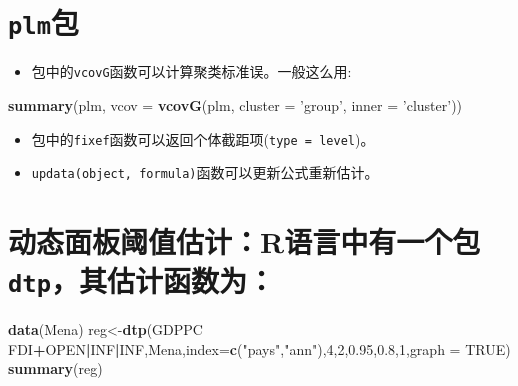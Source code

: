 \documentclass[
]{book}
\newenvironment{Shaded}{\begin{snugshade}}{\end{snugshade}}
\newcommand{\DataTypeTok}[1]{\textcolor[rgb]{0.13,0.29,0.53}{#1}}
\newcommand{\DecValTok}[1]{\textcolor[rgb]{0.00,0.00,0.81}{#1}}
\newcommand{\FloatTok}[1]{\textcolor[rgb]{0.00,0.00,0.81}{#1}}
\newcommand{\KeywordTok}[1]{\textcolor[rgb]{0.13,0.29,0.53}{\textbf{#1}}}
\newcommand{\NormalTok}[1]{#1}
\newcommand{\OperatorTok}[1]{\textcolor[rgb]{0.81,0.36,0.00}{\textbf{#1}}}
\newcommand{\OtherTok}[1]{\textcolor[rgb]{0.56,0.35,0.01}{#1}}
\newcommand{\StringTok}[1]{\textcolor[rgb]{0.31,0.60,0.02}{#1}}
\providecommand{\tightlist}{%
  \setlength{\itemsep}{0pt}\setlength{\parskip}{0pt}}
\begin{document}
\hypertarget{plmux5305}{%
\section{\texorpdfstring{\texttt{plm}包}{plm包}}\label{plmux5305}}

\begin{itemize}
\tightlist
\item
  包中的\texttt{vcovG}函数可以计算聚类标准误。一般这么用:
\end{itemize}

\begin{Shaded}
\begin{Highlighting}[]
\KeywordTok{summary}\NormalTok{(plm, }\DataTypeTok{vcov =} \KeywordTok{vcovG}\NormalTok{(plm, }\DataTypeTok{cluster =} \StringTok{'group'}\NormalTok{, }\DataTypeTok{inner =} \StringTok{'cluster'}\NormalTok{))}
\end{Highlighting}
\end{Shaded}

\begin{itemize}
\tightlist
\item
  包中的\texttt{fixef}函数可以返回个体截距项(\texttt{type\ =\ level})。
\item
  \texttt{updata(object,\ formula)}函数可以更新公式重新估计。
\end{itemize}

\hypertarget{ux52a8ux6001ux9762ux677fux9608ux503cux4f30ux8ba1rux8bedux8a00ux4e2dux6709ux4e00ux4e2aux5305dtpux5176ux4f30ux8ba1ux51fdux6570ux4e3a}{%
\section{\texorpdfstring{动态面板阈值估计：R语言中有一个包\texttt{dtp}，其估计函数为：}{动态面板阈值估计：R语言中有一个包dtp，其估计函数为：}}\label{ux52a8ux6001ux9762ux677fux9608ux503cux4f30ux8ba1rux8bedux8a00ux4e2dux6709ux4e00ux4e2aux5305dtpux5176ux4f30ux8ba1ux51fdux6570ux4e3a}}

\begin{Shaded}
\begin{Highlighting}[]
\KeywordTok{data}\NormalTok{(Mena)}
\NormalTok{reg<-}\KeywordTok{dtp}\NormalTok{(GDPPC }\OperatorTok{~}\StringTok{ }\NormalTok{FDI}\OperatorTok{+}\NormalTok{OPEN}\OperatorTok{|}\NormalTok{INF}\OperatorTok{|}\NormalTok{INF,Mena,}\DataTypeTok{index=}\KeywordTok{c}\NormalTok{(}\StringTok{"pays"}\NormalTok{,}\StringTok{"ann"}\NormalTok{),}\DecValTok{4}\NormalTok{,}\DecValTok{2}\NormalTok{,}\FloatTok{0.95}\NormalTok{,}\FloatTok{0.8}\NormalTok{,}\DecValTok{1}\NormalTok{,}\DataTypeTok{graph =} \OtherTok{TRUE}\NormalTok{)}
\KeywordTok{summary}\NormalTok{(reg)}
\end{Highlighting}
\end{Shaded}
\end{document}
